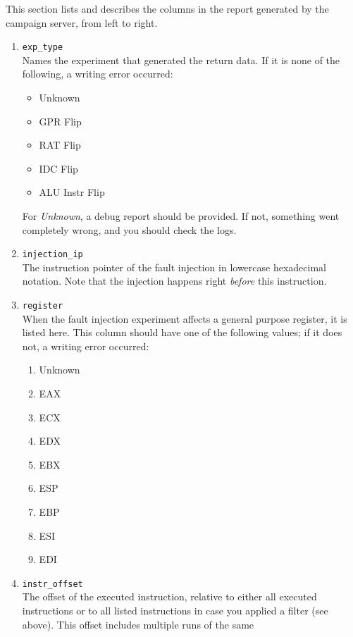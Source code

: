 \documentclass[a4paper,10pt]{article}
\begin{document}
This section lists and describes the columns in the report generated by
the campaign server, from left to right.

\begin{enumerate}
 \item \verb+exp_type+\\
       Names the experiment that generated the return data.
       If it is none of the following, a writing error occurred:
       \begin{itemize}
        \item Unknown
        \item GPR Flip
        \item RAT Flip
        \item IDC Flip
        \item ALU Instr Flip
       \end{itemize}
       For \emph{Unknown}, a debug report should be provided.
       If not, something went completely wrong, and you should
       check the logs.
 \item \verb+injection_ip+\\
       The instruction pointer of the fault injection
       in lowercase hexadecimal notation.
       Note that the injection happens right \emph{before} this
       instruction.
 \item \verb+register+\\
       When the fault injection experiment affects a general purpose register,
       it is listed here. This column should have one of the following values;
       if it does not, a writing error occurred:
       \begin{enumerate}
        \item Unknown
        \item EAX
        \item ECX
        \item EDX
        \item EBX
        \item ESP
        \item EBP
        \item ESI
        \item EDI
       \end{enumerate}
 \item \verb+instr_offset+\\
       The offset of the executed instruction, relative to either all executed
       instructions or to all listed instructions in case you applied
       a filter (see above). This offset includes multiple runs of the same

\end{enumerate}
\end{document}
